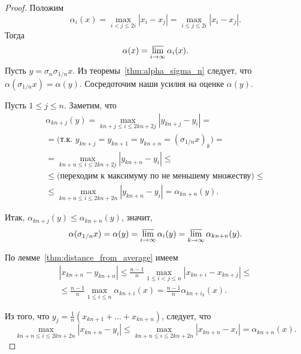 \begin{proof}
	Положим
	\begin{equation}
		\alpha_i(x) =
		\max_{i<j\leqslant 2i} |x_i - x_j| =
		\max_{i\leqslant j\leqslant 2i} |x_i - x_j|
		.
	\end{equation}
	Тогда
	\begin{equation}
		\alpha(x) = \varlimsup_{i\to\infty} \alpha_i(x)
		.
	\end{equation}
	Пусть $y=\sigma_n \sigma_{1/n} x$.
	Из теоремы~\ref{thm:alpha_sigma_n} следует, что $\alpha(\sigma_{1/n} x)=\alpha(y)$.
	Сосредоточим наши усилия на оценке $\alpha(y)$.

	Пусть $1\leq j \leq n$.
	Заметим, что
	\begin{multline}
		\alpha_{kn+j}(y)
		=
		\max_{kn+j \leq i \leq 2kn+2j } |y_{kn+j} - y_i|
		=
		\\=
		\mbox{(т.к. $y_{kn+j}=y_{kn+1}=y_{kn+n} = (\sigma_{1/n}x)_k$)}
		=
		\\=
		\max_{kn+n \leq i \leq 2kn+2j } |y_{kn+n} - y_i|
		\leq
		\\\leq
		\mbox{(переходим к максимуму по не меньшему множеству)}
		\leq
		\\\leq
		\max_{kn+n \leq i \leq 2kn+2n } |y_{kn+n} - y_i|
		=
		\alpha_{kn+n}(y)
		.
	\end{multline}

	Итак, $\alpha_{kn+j}(y) \leq \alpha_{kn+n}(y)$,
	значит,
	\begin{equation}
		\label{eq:alpha_sigma_1_n_subseq_limsup}
		\alpha(\sigma_{1/n}x) = \alpha(y) = \varlimsup_{i\to\infty} \alpha_i(y)
		=
		\varlimsup_{k\to\infty} \alpha_{kn+n}(y)
		.
	\end{equation}

	По лемме~\ref{thm:distance_from_average} имеем
	\begin{multline}
		\label{eq:alpha_sigma_1_n_distance}
		|x_{kn+n}-y_{kn+n}|
		\leq
		\frac{n-1}{n}\max_{1\leq i<j \leq n}|x_{kn+i}-x_{kn+j}|
		\leq
		\\\leq
		\frac{n-1}{n} \max_{1\leq i \leq n} \alpha_{kn+i}(x)
		=
		\frac{n-1}{n}\alpha_{kn+i_k}(x)
		.
	\end{multline}

	Из того, что $y_j = \frac{1}{n}(x_{kn+1}+...+x_{kn+n})$,
	следует, что
	\begin{equation}
		\label{eq:alpha_sigma_1_n_alpha_x}
		\max_{kn+n \leq i \leq 2kn+2n } |x_{kn+n} - y_i|
		\leq
		\max_{kn+n \leq i \leq 2kn+2n } |x_{kn+n} - x_i|
		=
		\alpha_{kn+n}(x)
		.
	\end{equation}


\end{proof}
